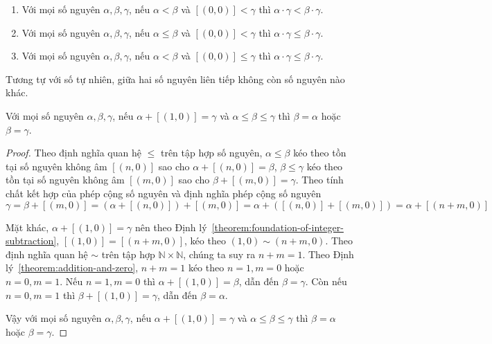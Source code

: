 \begin{corollary}
	\begin{enumerate}[label={(\roman*)}]
		\item Với mọi số nguyên $\alpha, \beta, \gamma$, nếu $\alpha < \beta$ và $[(0,0)] < \gamma$ thì $\alpha\cdot\gamma < \beta\cdot\gamma$.
		\item Với mọi số nguyên $\alpha, \beta, \gamma$, nếu $\alpha \leq \beta$ và $[(0,0)] < \gamma$ thì $\alpha\cdot\gamma \leq \beta\cdot\gamma$.
		\item Với mọi số nguyên $\alpha, \beta, \gamma$, nếu $\alpha < \beta$ và $[(0,0)] \leq \gamma$ thì $\alpha\cdot\gamma \leq \beta\cdot\gamma$.
	\end{enumerate}
\end{corollary}

Tương tự với số tự nhiên, giữa hai số nguyên liên tiếp không còn số nguyên nào khác.
\begin{theorem}
	Với mọi số nguyên $\alpha, \beta, \gamma$, nếu $\alpha + [(1,0)] = \gamma$ và $\alpha \leq \beta \leq \gamma$ thì $\beta = \alpha$ hoặc $\beta = \gamma$.
\end{theorem}

\begin{proof}
	Theo định nghĩa quan hệ $\leq$ trên tập hợp số nguyên, $\alpha \leq \beta$ kéo theo tồn tại số nguyên không âm $[(n,0)]$ sao cho $\alpha + [(n, 0)] = \beta$, $\beta \leq \gamma$ kéo theo tồn tại số nguyên không âm $[(m, 0)]$ sao cho $\beta + [(m, 0)] = \gamma$. Theo tính chất kết hợp của phép cộng số nguyên và định nghĩa phép cộng số nguyên
	\[
		\gamma = \beta + [(m, 0)] = (\alpha + [(n, 0)]) + [(m, 0)] = \alpha + ([(n, 0)] + [(m, 0)]) = \alpha + [(n+m, 0)]
	\]

	Mặt khác, $\alpha + [(1, 0)] = \gamma$ nên theo Định lý~\ref{theorem:foundation-of-integer-subtraction}, $[(1, 0)] = [(n+m, 0)]$, kéo theo $(1, 0)\sim (n+m, 0)$. Theo định nghĩa quan hệ $\sim$ trên tập hợp $\mathbb{N}\times\mathbb{N}$, chúng ta suy ra $n + m = 1$. Theo Định lý~\ref{theorem:addition-and-zero}, $n + m = 1$ kéo theo $n = 1, m = 0$ hoặc $n = 0, m = 1$. Nếu $n = 1, m = 0$ thì $\alpha + [(1, 0)] = \beta$, dẫn đến $\beta = \gamma$. Còn nếu $n = 0, m = 1$ thì $\beta + [(1, 0)] = \gamma$, dẫn đến $\beta = \alpha$.

	Vậy với mọi số nguyên $\alpha, \beta, \gamma$, nếu $\alpha + [(1,0)] = \gamma$ và $\alpha \leq \beta \leq \gamma$ thì $\beta = \alpha$ hoặc $\beta = \gamma$.
\end{proof}

